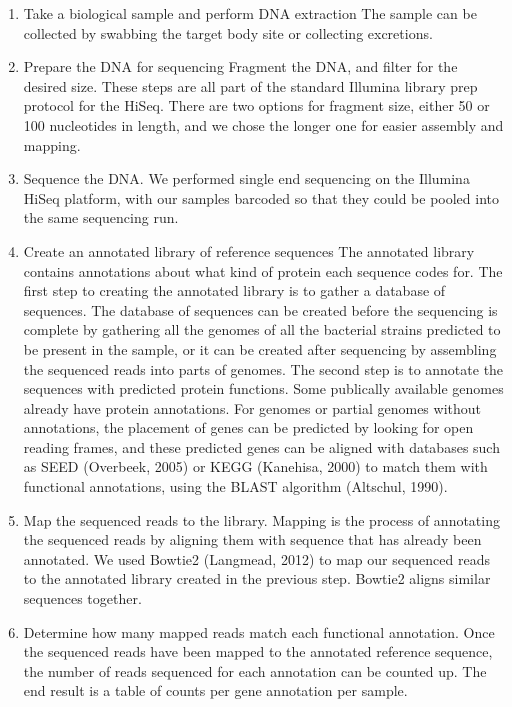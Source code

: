 \begin{enumerate}
\item Take a biological sample and perform DNA extraction
The sample can be collected by swabbing the target body site or collecting excretions.

\item Prepare the DNA for sequencing
Fragment the DNA, and filter for the desired size. These steps are all part of the standard Illumina library prep protocol for the HiSeq. There are two options for fragment size, either 50 or 100 nucleotides in length, and we chose the longer one for easier assembly and mapping.

\item Sequence the DNA.
We performed single end sequencing on the Illumina HiSeq platform, with our samples barcoded so that they could be pooled into the same sequencing run.

\item Create an annotated library of reference sequences
The annotated library contains annotations about what kind of protein each sequence codes for. The first step to creating the annotated library is to gather a database of sequences. The database of sequences can be created before the sequencing is complete by gathering all the genomes of all the bacterial strains predicted to be present in the sample, or it can be created after sequencing by assembling the sequenced reads into parts of genomes. The second step is to annotate the sequences with predicted protein functions. Some publically available genomes already have protein annotations. For genomes or partial genomes without annotations, the placement of genes can be predicted by looking for open reading frames, and these predicted genes can be aligned with databases such as SEED (Overbeek, 2005) or KEGG (Kanehisa, 2000) to match them with functional annotations, using the BLAST algorithm (Altschul, 1990).

\item Map the sequenced reads to the library.
Mapping is the process of annotating the sequenced reads by aligning them with sequence that has already been annotated. We used Bowtie2 (Langmead, 2012) to map our sequenced reads to the annotated library created in the previous step. Bowtie2 aligns similar sequences together.

\item Determine how many mapped reads match each functional annotation.
Once the sequenced reads have been mapped to the annotated reference sequence, the number of reads sequenced for each annotation can be counted up. The end result is a table of counts per gene annotation per sample.
\end{enumerate}

